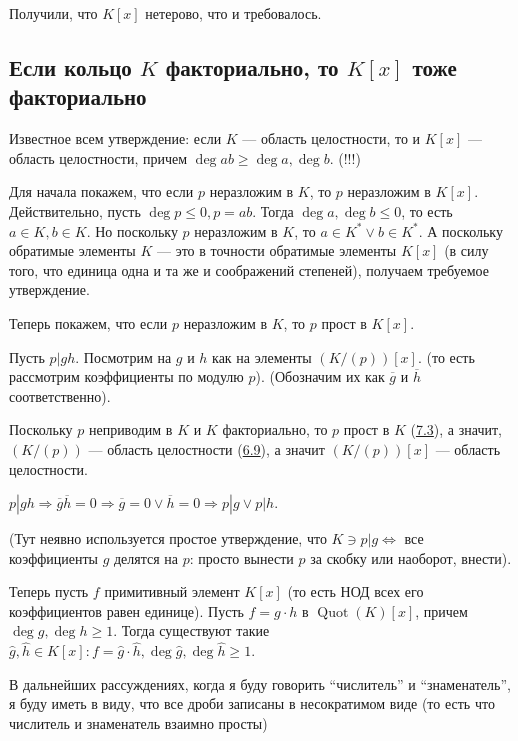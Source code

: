 \documentclass[../main.tex]{subfiles}
\begin{document}
    Получили, что $K[x]$ нетерово, что и требовалось.


\hypertarget{9.3}{\subsection{Если кольцо $K$ факториально, то $K[x]$
    тоже факториально}}

    Известное всем утверждение: если $K$ --- область целостности, то и
    $K[x]$ --- область целостности, причем $\deg ab \geqslant \deg a, \deg b$.
    ({!!!})

    Для начала покажем, что если $p$ неразложим в $K$, то $p$ неразложим
    в $K[x]$. Действительно, пусть $\deg p \leqslant 0, p = ab$. Тогда
    $\deg a, \deg b \leqslant 0$, то есть $a \in K, b \in K$. Но поскольку
    $p$ неразложим в $K$, то $a \in K^* \lor b \in K^*$. А поскольку
    обратимые элементы $K$ --- это в точности обратимые элементы $K[x]$
    (в силу того, что единица одна и та же и соображений степеней), получаем
    требуемое утверждение.

    Теперь покажем, что если $p$ неразложим в $K$, то $p$ прост в $K[x]$.

    Пусть $p | gh$. Посмотрим на $g$ и $h$ как на элементы $(K / (p))[x]$.
    (то есть рассмотрим коэффициенты по модулю $p$).
    (Обозначим их как $\overline{g}$ и $\overline{h}$ соответственно).

    Поскольку $p$ неприводим в $K$ и $K$ факториально, то $p$ прост в $K$
    (\hyperlink{7.3}{7.3}), а значит, $(K / (p))$ --- область целостности
    (\hyperlink{6.9}{6.9}), а значит $(K / (p))[x]$ --- область целостности.

    $p | gh \Rightarrow \overline{g}\overline{h} = 0 \Rightarrow
    \overline{g} = 0 \lor \overline{h} = 0 \Rightarrow p | g \lor p | h$.

    (Тут неявно используется простое утверждение, что $K \ni p | g
    \Leftrightarrow $ все коэффициенты $g$ делятся на $p$: просто вынести $p$
    за скобку или наоборот, внести).

    Теперь пусть $f$ примитивный элемент $K[x]$ (то есть НОД всех его
    коэффициентов равен единице). Пусть $f = g \cdot h$ в
    $\operatorname{Quot}(K)[x]$, причем $\deg g, \deg h \geqslant 1$. Тогда
    существуют такие $\hat{g}, \hat{h} \in K[x]: f = \hat{g} \cdot \hat{h},
    \deg \hat{g}, \deg \hat{h} \geqslant 1$.

    В дальнейших рассуждениях, когда я буду говорить ``числитель'' и
    ``знаменатель'', я буду иметь в виду, что все дроби записаны в несократимом
    виде (то есть что числитель и знаменатель взаимно просты)
\end{document}
